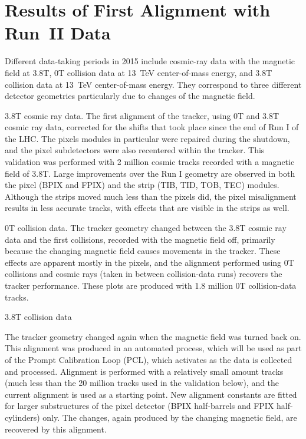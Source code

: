 \section{Results of First Alignment with Run~II Data}
\label{sec:alignmentResults}

Different data-taking periods in 2015 include cosmic-ray data with the magnetic field at 3.8T, 0T collision data at 13~TeV center-of-mass energy, and 3.8T collision data at 13~TeV center-of-mass energy. They correspond to three different detector geometries particularly due to changes of the magnetic field. 

3.8T cosmic ray data. The first alignment of the tracker, using 0T and 3.8T cosmic ray data, corrected for the shifts that took place since the end of Run I of the LHC. The pixels modules in particular were repaired during the shutdown, and the pixel subdetectors were also recentered within the tracker. This validation was performed with 2 million cosmic tracks recorded with a magnetic field of 3.8T. Large improvements over the Run I geometry are observed in both the pixel (BPIX and FPIX) and the strip (TIB, TID, TOB, TEC) modules. Although the strips moved much less than the pixels did, the pixel misalignment results in less accurate tracks, with effects that are visible in the strips as well. 

0T collision data. The tracker geometry changed between the 3.8T cosmic ray data and the first collisions, recorded with the magnetic field off, primarily because the changing magnetic field causes movements in the tracker. These effects are apparent mostly in the pixels, and the alignment performed using 0T collisions and cosmic rays (taken in between collision-data runs) recovers the tracker performance. These plots are produced with 1.8 million 0T collision-data tracks.

3.8T collision data

The tracker geometry changed again when the magnetic field was turned back on. This alignment was produced in an automated process, which will be used as part of the Prompt Calibration Loop (PCL), which activates as the data is collected and processed. Alignment is performed with a relatively small amount tracks (much less than the 20 million tracks used in the validation below), and the current alignment is used as a starting point. New alignment constants are fitted for larger substructures of the pixel detector (BPIX half-barrels and FPIX half-cylinders) only. The changes, again produced by the changing magnetic field, are recovered by this alignment.

